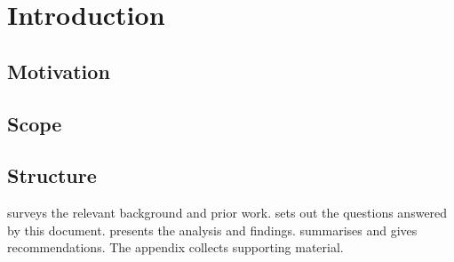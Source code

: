 \chapter{Introduction}
\label{ch:introduction}


\section{Motivation}
\label{sec:intro:motivation}


\section{Scope}
\label{sec:intro:scope}


\section{Structure}
\label{sec:intro:structure}

 surveys the relevant background and prior work.
 sets out the questions answered by this document.
 presents the analysis and findings.
 summarises and gives recommendations.
The appendix collects supporting material.

